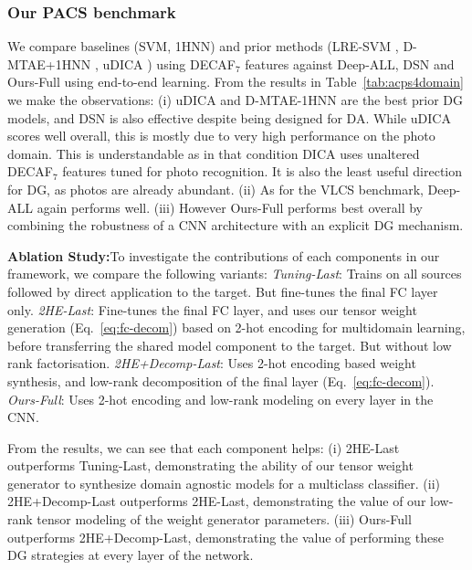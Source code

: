 \documentclass[10pt,twocolumn,letterpaper]{article}
\begin{document}
\subsubsection{Our PACS benchmark}
We compare baselines (SVM, 1HNN) and prior methods (LRE-SVM \cite{xu2014exploiting}, D-MTAE+1HNN \cite{ghifary2015domain}, uDICA \cite{muandet2013domainGen}) using DECAF$_7$ features against Deep-ALL, DSN \cite{bousmalis2016domain} and Ours-Full using end-to-end learning. From the results in Table~\ref{tab:acps4domain} we make the observations: (i) uDICA and D-MTAE-1HNN are the best prior DG models, and DSN is also effective despite being designed for DA. While uDICA scores well overall, this is mostly due to very high performance on the photo domain. This is understandable as in that condition DICA uses unaltered DECAF$_7$ features tuned for photo recognition. It is also the least useful direction for DG, as photos are already abundant.
(ii) As for the VLCS benchmark, Deep-ALL again performs well. (iii) However Ours-Full performs best overall by combining the robustness of a CNN architecture with an explicit DG mechanism.











\noindent\textbf{Ablation Study:}\quad To investigate the contributions of each components in our framework, we compare the following variants: \emph{Tuning-Last}: Trains on all sources followed by direct application to the target. But fine-tunes the final FC layer only. \emph{2HE-Last}: Fine-tunes the final FC layer, and uses our tensor weight generation (Eq.~\ref{eq:fc-decom}) based on 2-hot encoding for multidomain learning, before transferring the shared model component to the target. But without low rank factorisation. \emph{2HE+Decomp-Last}: Uses 2-hot encoding based weight synthesis, and low-rank decomposition of the final layer (Eq.~\ref{eq:fc-decom}). \emph{Ours-Full}: Uses 2-hot encoding and low-rank modeling on every layer in the CNN. 

From the results, we can see that each component helps: (i) 2HE-Last outperforms Tuning-Last, demonstrating the ability of our tensor weight generator to synthesize domain agnostic models for a multiclass classifier. (ii) 2HE+Decomp-Last outperforms 2HE-Last, demonstrating the value of our low-rank tensor modeling of the weight generator parameters. (iii) Ours-Full outperforms 2HE+Decomp-Last, demonstrating the value of performing these DG strategies at every layer of the network. 
\end{document}
